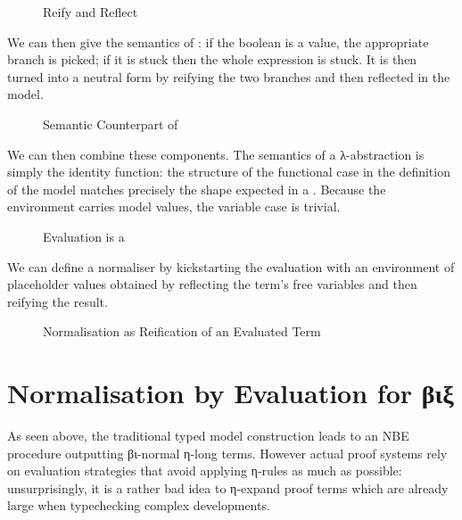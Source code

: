 \begin{figure}[h]
\caption{Reify and Reflect\label{fig:reifyreflectnbe}}
\end{figure}

We can then give the semantics of : if the boolean is a value, the
appropriate branch is picked; if it is stuck then the whole expression is stuck.
It is then turned into a neutral form by reifying the two branches and then reflected
in the model.

\begin{figure}[h]
\caption{Semantic Counterpart of \label{fig:nbeifte}}
\end{figure}

We can then combine these components. The semantics of a λ-abstraction is simply the
identity function: the structure of the functional case in the definition of the model
matches precisely the shape expected in a . Because the environment
carries model values, the variable case is trivial.

\begin{figure}[h]
\caption{Evaluation is a \label{fig:evalnbe}}
\end{figure}

We can define a normaliser by kickstarting the evaluation with an environment of
placeholder values obtained by reflecting the term's free variables and then reifying
the result.

\begin{figure}[h]
\caption{Normalisation as Reification of an Evaluated Term\label{fig:normnbe}}
\end{figure}

\section{Normalisation by Evaluation for βιξ}

As seen above, the traditional typed model construction leads to an NBE
procedure outputting βι-normal η-long terms. However actual proof systems
rely on evaluation strategies that avoid applying η-rules
as much as possible: unsurprisingly, it is a rather bad idea to η-expand proof
terms which are already large when typechecking complex developments.

